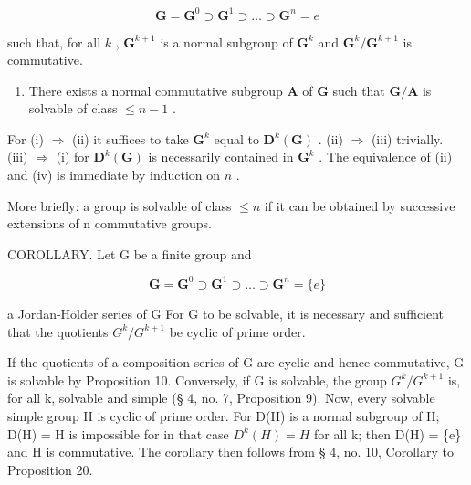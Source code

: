 \[
\mathbf {G} = \mathbf {G} ^ {0} \supset \mathbf {G} ^ {1} \supset \dots \supset \mathbf {G} ^ {n} = e
\]

such that, for all \(k\) , \(\mathbf{G}^{k+1}\) is a normal subgroup of \(\mathbf{G}^k\) and \(\mathbf{G}^k/\mathbf{G}^{k+1}\) is commutative.

\begin{enumerate}
\def\labelenumi{(\roman{enumi})}
\setcounter{enumi}{3}
\tightlist
\item
  There exists a normal commutative subgroup \(\mathbf{A}\) of \(\mathbf{G}\) such that \(\mathbf{G} / \mathbf{A}\) is solvable of class \(\leqslant n - 1\) .
\end{enumerate}

For (i) \(\Rightarrow\) (ii) it suffices to take \(\mathbf{G}^k\) equal to \(\mathbf{D}^k (\mathbf{G})\) . (ii) \(\Rightarrow\) (iii) trivially. (iii) \(\Rightarrow\) (i) for \(\mathbf{D}^k (\mathbf{G})\) is necessarily contained in \(\mathbf{G}^k\) . The equivalence of (ii) and (iv) is immediate by induction on \(n\) .

More briefly: a group is solvable of class \(\leqslant n\) if it can be obtained by successive extensions of n commutative groups.

COROLLARY. Let G be a finite group and

\[
\mathbf {G} = \mathbf {G} ^ {0} \supset \mathbf {G} ^ {1} \supset \dots \supset \mathbf {G} ^ {n} = \{e \}
\]

a Jordan-Hölder series of G For G to be solvable, it is necessary and sufficient that the quotients \(G^{k}/G^{k+1}\) be cyclic of prime order.

If the quotients of a composition series of G are cyclic and hence commutative, G is solvable by Proposition 10. Conversely, if G is solvable, the group \(G^{k}/G^{k+1}\) is, for all k, solvable and simple (§ 4, no. 7, Proposition 9). Now, every solvable simple group H is cyclic of prime order. For D(H) is a normal subgroup of H; D(H) = H is impossible for in that case \(D^{k}(H) = H\) for all k; then D(H) = \{e\} and H is commutative. The corollary then follows from § 4, no. 10, Corollary to Proposition 20.

